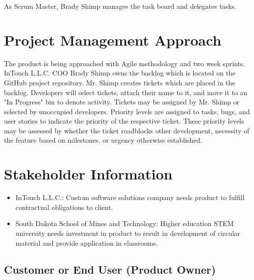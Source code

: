 As Scrum Master, Brady Shimp manages the task board and delegates tasks. 

\section{Project  Management Approach}

The product is being approached with Agile methodology and two week sprints. InTouch L.L.C. COO Brady Shimp owns the backlog which is located on the GitHub project repository. Mr. Shimp creates tickets which are placed in the backlog. Developers will select tickets, attach their name to it, and move it to an "In Progress" bin to denote activity. Tickets may be assigned by Mr. Shimp or selected by unoccupied developers. Priority levels are assigned to tasks, bugs, and user stories to indicate the priority of the respective ticket. These priority levels may be assessed by whether the ticket roadblocks other development, necessity of the feature based on milestones, or urgency otherwise established.

\section{ Stakeholder Information}



\begin{itemize}
	\item InTouch L.L.C.: Custom software solutions company needs product to fulfill contractual obligations to client. 
	\item South Dakota School of Mines and Technology: Higher education STEM university needs investment in product to result in development of circular material and provide application in classrooms.
\end{itemize}


\subsection{Customer or End User (Product Owner)}

